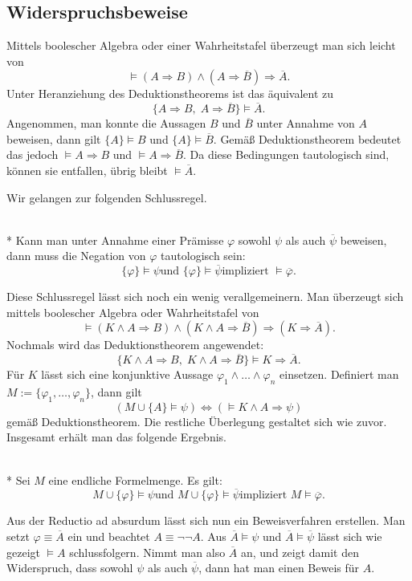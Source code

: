 \newpage
\subsection{Widerspruchsbeweise}
Mittels boolescher Algebra oder einer Wahrheitstafel überzeugt man
sich leicht von
\[\models (A\Rightarrow B)\land (A\Rightarrow\overline B)\Rightarrow\overline A.\]
Unter Heranziehung des Deduktionstheorems ist das äquivalent zu
\[\{A\Rightarrow B,\;A\Rightarrow\overline B\}\models\overline A.\]
Angenommen, man konnte die Aussagen $B$ und $\overline B$
unter Annahme von $A$ beweisen, dann gilt $\{A\}\models B$
und $\{A\}\models\overline B$. Gemäß Deduktionstheorem
bedeutet das jedoch $\models A\Rightarrow B$ und
$\models A\Rightarrow\overline B$. Da diese Bedingungen tautologisch
sind, können sie entfallen, übrig bleibt $\models\overline A$.

Wir gelangen zur folgenden Schlussregel.

\begin{Satz}\mbox{}\\*
Kann man unter Annahme einer Prämisse $\varphi$ sowohl
$\psi$ als auch $\overline\psi$ beweisen, dann muss
die Negation von $\varphi$ tautologisch sein:
\[\text{$\{\varphi\}\models\psi$
und $\{\varphi\}\models\overline\psi$
impliziert $\models\overline\varphi$}.\]
\end{Satz}

\noindent
Diese Schlussregel lässt sich noch ein wenig verallgemeinern.
Man überzeugt sich mittels boolescher Algebra oder Wahrheitstafel von
\[\models (K\land A\Rightarrow B)\land (K\land A\Rightarrow\overline B)
\Rightarrow (K\Rightarrow\overline A).\]
Nochmals wird das Deduktionstheorem angewendet:
\[\{K\land A\Rightarrow B,\;K\land A\Rightarrow\overline B\}
\models K\Rightarrow\overline A.\]
Für $K$ lässt sich eine konjunktive Aussage
$\varphi_1\land\ldots\land\varphi_n$ einsetzen.
Definiert man $M:=\{\varphi_1,\ldots,\varphi_n\}$, dann gilt
\[(M\cup\{A\}\models\psi)\iff (\models K\land A\Rightarrow\psi)\]
gemäß Deduktionstheorem. Die restliche Überlegung gestaltet
sich wie zuvor. Insgesamt erhält man das folgende Ergebnis.
\begin{Satz}\mbox{}\\*
Sei $M$ eine endliche Formelmenge. Es gilt:
\[\text{$M\cup\{\varphi\}\models\psi$
und $M\cup\{\varphi\}\models\overline\psi$
impliziert $M\models\overline\varphi$}.\]
\end{Satz}

\noindent
Aus der Reductio ad absurdum lässt sich nun ein
Beweisverfahren erstellen. Man setzt $\varphi\equiv\overline A$ ein
und beachtet $A\equiv\neg\neg A$. Aus $\overline A\models\psi$
und $\overline A\models\overline\psi$ lässt sich wie gezeigt
$\models A$ schlussfolgern. Nimmt man also $\overline A$ an,
und zeigt damit den Widerspruch, dass sowohl $\psi$ als auch
$\overline\psi$, dann hat man einen Beweis für $A$.


